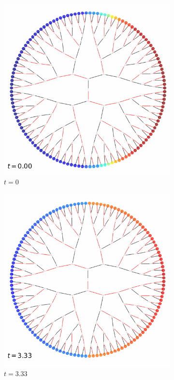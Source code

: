 \begin{figure}
	\begin{subfigure}{.5\textwidth}
		\centering
		\includegraphics[width=.8\linewidth]{img/solutions/normal_0}
		\caption{$t=0$}
		\label{fig:sfig1}
	\end{subfigure}%
	\begin{subfigure}{.5\textwidth}
		\centering
		\includegraphics[width=.8\linewidth]{img/solutions/normal_1}
		\caption{$t=3.33$}
		\label{fig:sfig1}
	\end{subfigure}
	\begin{subfigure}{.5\textwidth}

\end{subfigure}
\end{figure}
